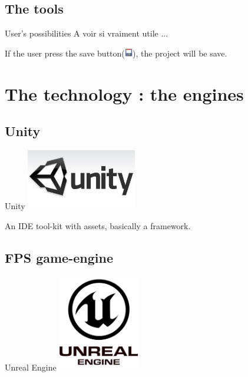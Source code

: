 \documentclass[a4paper,10pt]{beamer}
\begin{document}
		\subsection{The tools}
		
			\begin{frame}{User's possibilities}
				A voir si vraiment utile ...
				
				If the user press the save button(\includegraphics[height=10pt]{images/saveIcone.png}), the project will be save.
			\end{frame}
	
	\section{The technology : the engines}
	
		\subsection{Unity}
		
			\begin{frame}{Unity}
				\includegraphics[height=75pt]{images/Logo_Unity.jpg}
				
				 An IDE tool-kit with assets, basically a framework. 
			\end{frame}
			
		\subsection{FPS game-engine}
		
			\begin{frame}{Unreal Engine}
				\includegraphics[height=120pt]{images/Unreal_Engine.png}
			\end{frame}
			
\end{document}
